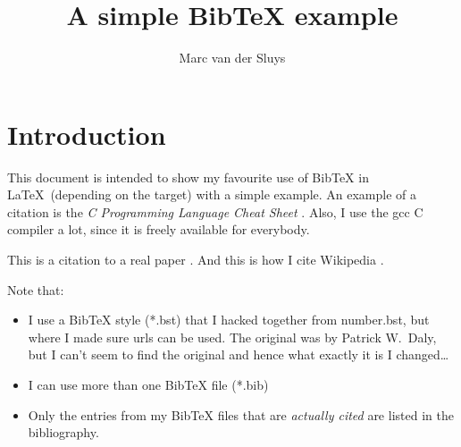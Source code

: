 \documentclass[11pt]{article}
\title{A simple BibTeX example}
\author{Marc van der Sluys}
\begin{document}
\maketitle

\tableofcontents


\section{Introduction}

This document is intended to show my favourite use of BibTeX in \LaTeX\ (depending on the target) with a simple example.
An example of a citation is the \emph{C Programming Language Cheat Sheet} \cite{Choudhary}.  Also, I use the gcc
C compiler \cite{gcc} a lot, since it is freely available for everybody.

This is a citation to a real paper \cite{leung1980scheduling}.  And this is how I cite Wikipedia \cite{wiki:Cron}.

Note that:
\begin{itemize}
\item I use a BibTeX style (*.bst) that I hacked together from number.bst, but where I made sure urls can be
  used.  The original was by Patrick W.\ Daly, but I can't seem to find the original and hence what exactly it
  is I changed\ldots
\item I can use more than one BibTeX file (*.bib)
\item Only the entries from my BibTeX files that are \emph{actually cited} are listed in the bibliography.
\end{itemize}



\end{document}
